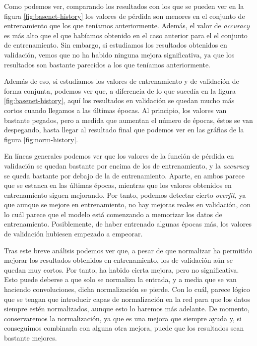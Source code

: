 \documentclass[11pt,a4paper]{article}
\begin{document}
Como podemos ver, comparando los resultados con los que se pueden ver en la figura \ref{fig:basenet-history} los valores de
pérdida son menores en el conjunto de entrenamiento que los que teníamos anteriormente. Además, el valor de \textit{accuracy}
es más alto que el que habíamos obtenido en el caso anterior para el el conjunto de entrenamiento. Sin embargo, si estudiamos
los resultados obtenidos en validación, vemos que no ha habido ninguna mejora significativa, ya que los resultados son bastante
parecidos a los que teníamos anteriormente.

Además de eso, si estudiamos los valores de entrenamiento y de validación de forma conjunta, podemos ver que, a diferencia
de lo que sucedía en la figura \ref{fig:basenet-history}, aquí los resultados en validación se quedan mucho más cortos cuando
llegamos a las últimas épocas. Al principio, los valores van bastante pegados, pero a medida que aumentan el número de épocas,
éstos se van despegando, hasta llegar al resultado final que podemos ver en las gráfias de la figura \ref{fig:norm-history}.

En líneas generales podemos ver que los valores de la función de pérdida en validación se quedan bastante por encima de los de
entrenamiento, y la \textit{accuracy} se queda bastante por debajo de la de entrenamiento. Aparte, en ambos parece que se estanca
en las últimas épocas, mientras que los valores obtenidos en entrenamiento siguen mejorando. Por tanto, podemos detectar cierto
\textit{overfit}, ya que aunque se mejore en entrenamiento, no hay mejoras reales en validación, con lo cuál parece
que el modelo está comenzando a memorizar los datos de entrenamiento. Posiblemente, de haber entrenado algunas épocas más,
los valores de validación hubiesen empezado a empeorar.

Tras este breve análisis podemos ver que, a pesar de que normalizar ha permitido mejorar los resultados obtenidos en entrenamiento,
los de validación aún se quedan muy cortos. Por tanto, ha habido cierta mejora, pero no significativa. Esto puede deberse a que
solo se normaliza la entrada, y a media que se van haciendo convoluciones, dicha normalización se pierde. Con lo cuál, parece
lógico que se tengan que introducir capas de normalización en la red para que los datos siempre estén normalizados, aunque
esto lo haremos más adelante. De momento, conservaremos la normalización, ya que es una mejora que siempre ayuda y, si conseguimos
combinarla con alguna otra mejora, puede que los resultados sean bastante mejores.
\end{document}
